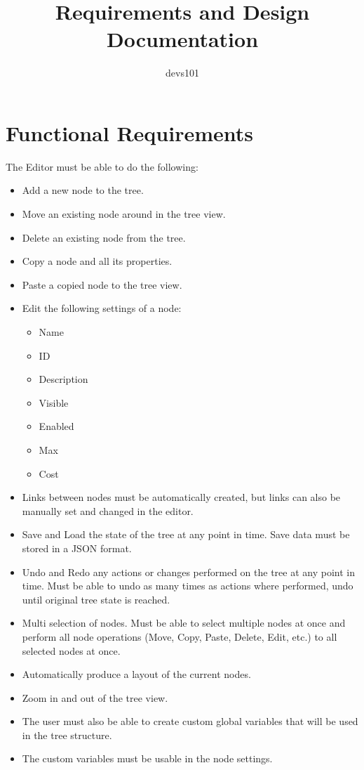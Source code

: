 \documentclass{article}
\title{Requirements and Design Documentation}
\author{devs101}
\begin{document}
\tableofcontents
\newpage

\section{Functional Requirements}
The Editor must be able to do the following:
\begin{itemize}
\item Add a new node to the tree.
\item Move an existing node around in the tree view.
\item Delete an existing node from the tree.
\item Copy a node and all its properties.
\item Paste a copied node to the tree view.
\item Edit the following settings of a node:
 \begin{itemize}
  \item	Name
  \item ID
  \item Description
  \item Visible
  \item Enabled
  \item Max
  \item Cost
 \end{itemize}
\item Links between nodes must be automatically created, but links can also be manually set and changed in the editor.
\item Save and Load the state of the tree at any point in time. Save data must be stored in a JSON format.
\item Undo and Redo any actions or changes performed on the tree at any point in time. Must be able to undo as many times as actions where performed, undo until original tree state is reached.
\item Multi selection of nodes. Must be able to select multiple nodes at once and perform all node operations (Move, Copy, Paste, Delete, Edit, etc.) to all selected nodes at once.
\item Automatically produce a layout of the current nodes.
\item Zoom in and out of the tree view.
\item The user must also be able to create custom global variables that will be used in the tree structure.
\item The custom variables must be usable in the node settings.
\end{itemize}
\end{document}
